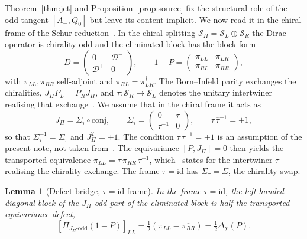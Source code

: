 \documentclass[11pt]{article}
\newtheorem{lemma}{Lemma}
\theoremstyle{definition}
\theoremstyle{remark}
\newcommand{\JPi}{J_{\Pi}}
\newcommand{\Dchi}{\Delta_{\chi}}
\newcommand{\Deff}{\mathcal{D}}
\newcommand{\Podd}{\Pi_{\JPi\text{-odd}}}
\begin{document}
    Theorem~\ref{thm:jet} and Proposition~\ref{prop:source} fix the structural role of the odd tangent $[A_-, Q_0]$ but
    leave its content implicit.
    We now read it in the chiral frame of the Schur reduction~\cite{Beau2026prs}.
    In the chiral splitting $\mathcal{S}_\Pi = \mathcal{S}_L \oplus \mathcal{S}_R$ the Dirac operator is chirality-odd
    and
    the eliminated block has the block form~\cite{Beau2026prs}
    \begin{equation}
      \label{eq:chiralblocks}
      D = \begin{pmatrix} 0 & \Deff^{-} \\ \Deff^{+} & 0 \end{pmatrix},
      \qquad
      1 - P = \begin{pmatrix} \pi_{LL} & \pi_{LR} \\ \pi_{RL} & \pi_{RR} \end{pmatrix},
    \end{equation}
    with $\pi_{LL}, \pi_{RR}$ self-adjoint and $\pi_{RL} = \pi_{LR}^{\dagger}$.
    The Born--Infeld parity exchanges the chiralities, $\JPi P_L = P_R \JPi$, and $\tau : \mathcal{S}_R \to
    \mathcal{S}_L$ denotes the unitary intertwiner realising that exchange~\cite{Beau2026prs, Beau2026q14}.
    We assume that in the chiral frame it acts as
    \begin{equation}
      \label{eq:chiralparity}
      \JPi = \Sigma_\tau \circ \mathrm{conj},
      \qquad
      \Sigma_\tau = \begin{pmatrix} 0 & \tau \\ \tau^{-1} & 0 \end{pmatrix},
      \qquad
      \tau\,\overline{\tau}^{-1} = \pm 1,
    \end{equation}
    so that $\Sigma_\tau^{-1} = \Sigma_\tau$ and $\JPi^2 = \pm 1$.
    The condition $\tau\,\overline{\tau}^{-1} = \pm 1$ is an assumption of the present note, not taken
    from~\cite{Beau2026prs}.
    The equivariance $[P, \JPi] = 0$ then yields the transported equivalence
    $\pi_{LL} = \tau\,\overline{\pi_{RR}}\,\tau^{-1}$, which~\cite{Beau2026prs} states for the intertwiner $\tau$
    realising the chirality exchange.
    The frame $\tau = \mathrm{id}$ has $\Sigma_\tau = \Sigma$, the chirality swap.

    \begin{lemma}[Defect bridge, $\tau = \mathrm{id}$ frame]
      \label{lem:bridge}
      In the frame $\tau = \mathrm{id}$, the left-handed diagonal block of the $\JPi$-odd part of the eliminated block
      is
      half the transported equivariance defect,
      \begin{equation}
        \label{eq:bridge}
        [\Podd(1-P)]_{LL} = \tfrac12(\pi_{LL} - \overline{\pi_{RR}}) = \tfrac12 \Dchi(P).
      \end{equation}
    \end{lemma}
\end{document}
